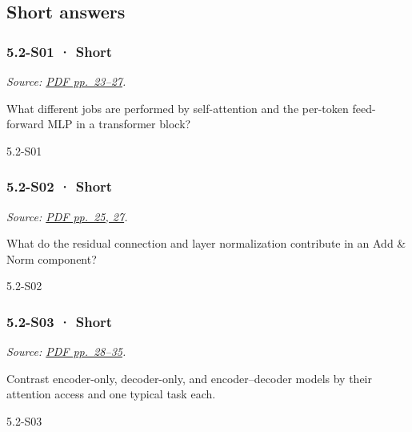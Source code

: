 \subsection{Short answers}\label{short-answers-14}

\noindent\begin{minipage}{\linewidth}

\subsubsection{5.2-S01 · Short}\label{s01-short-13}

\emph{Source:
\href{../Lecture\%20Slides/5.2.\%20Transformers.pdf\#page=23}{PDF
pp.~23--27}.}

What different jobs are performed by self-attention and the per-token
feed-forward MLP in a transformer block?

\begin{solution}[20mm]{5.2-S01}

\end{solution}
\end{minipage}\par\medskip

\noindent\begin{minipage}{\linewidth}

\subsubsection{5.2-S02 · Short}\label{s02-short-13}

\emph{Source:
\href{../Lecture\%20Slides/5.2.\%20Transformers.pdf\#page=25}{PDF
pp.~25, 27}.}

What do the residual connection and layer normalization contribute in an
Add \& Norm component?

\begin{solution}[20mm]{5.2-S02}

\end{solution}
\end{minipage}\par\medskip

\noindent\begin{minipage}{\linewidth}

\subsubsection{5.2-S03 · Short}\label{s03-short-13}

\emph{Source:
\href{../Lecture\%20Slides/5.2.\%20Transformers.pdf\#page=28}{PDF
pp.~28--35}.}

Contrast encoder-only, decoder-only, and encoder--decoder models by
their attention access and one typical task each.

\begin{solution}[20mm]{5.2-S03}

\end{solution}
\end{minipage}\par\medskip

